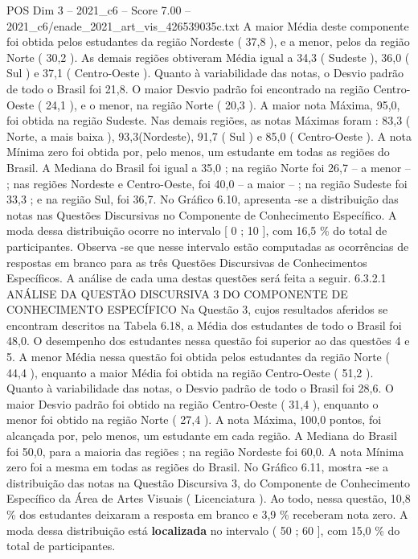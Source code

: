 \begin{textsample}{POS Dim 3 – 2021\_c6 – Score 7.00 – 2021\_c6/enade\_2021\_art\_vis\_426539035c.txt}
A maior Média deste componente foi obtida pelos estudantes da região Nordeste ( 37,8 ), e a menor, pelos da região Norte ( 30,2 ).
As demais regiões obtiveram Média igual a 34,3 ( Sudeste ), 36,0 ( Sul ) e 37,1 ( Centro-Oeste ).
Quanto à variabilidade das notas, o Desvio padrão de todo o Brasil foi 21,8.
O maior Desvio padrão foi encontrado na região Centro-Oeste ( 24,1 ), e o menor, na região Norte ( 20,3 ).
A maior nota Máxima, 95,0, foi obtida na região Sudeste.
Nas demais regiões, as notas Máximas foram : 83,3 ( Norte, a mais baixa ), 93,3(Nordeste), 91,7 ( Sul ) e 85,0 ( Centro-Oeste ).
A nota Mínima zero foi obtida por, pelo menos, um estudante em todas as regiões do Brasil.
A Mediana do Brasil foi igual a 35,0 ; na região Norte foi 26,7 – a menor – ; nas regiões Nordeste e Centro-Oeste, foi 40,0 – a maior – ; na região Sudeste foi 33,3 ; e na região Sul, foi 36,7.
No Gráfico 6.10, apresenta -se a distribuição das notas nas Questões Discursivas no Componente de Conhecimento Específico.
A moda dessa distribuição ocorre no intervalo [ 0 ; 10 ], com 16,5 \% do total de participantes.
Observa -se que nesse intervalo estão computadas as ocorrências de respostas em branco para as três Questões Discursivas de Conhecimentos Específicos.
A análise de cada uma destas questões será feita a seguir. 6.3.2.1 ANÁLISE DA QUESTÃO DISCURSIVA 3 DO COMPONENTE DE CONHECIMENTO ESPECÍFICO Na Questão 3, cujos resultados aferidos se encontram descritos na Tabela 6.18, a Média dos estudantes de todo o Brasil foi 48,0.
O desempenho dos estudantes nessa questão foi superior ao das questões 4 e 5.
A menor Média nessa questão foi obtida pelos estudantes da região Norte ( 44,4 ), enquanto a maior Média foi obtida na região Centro-Oeste ( 51,2 ).
Quanto à variabilidade das notas, o Desvio padrão de todo o Brasil foi 28,6.
O maior Desvio padrão foi obtido na região Centro-Oeste ( 31,4 ), enquanto o menor foi obtido na região Norte ( 27,4 ).
A nota Máxima, 100,0 pontos, foi alcançada por, pelo menos, um estudante em cada região.
A Mediana do Brasil foi 50,0, para a maioria das regiões ; na região Nordeste foi 60,0.
A nota Mínima zero foi a mesma em todas as regiões do Brasil.
No Gráfico 6.11, mostra -se a distribuição das notas na Questão Discursiva 3, do Componente de Conhecimento Específico da Área de Artes Visuais ( Licenciatura ).
Ao todo, nessa questão, 10,8 \% dos estudantes deixaram a resposta em branco e 3,9 \% receberam nota zero.
A moda dessa distribuição está \textbf{localizada} no intervalo ( 50 ; 60 ], com 15,0 \% do total de participantes.

\end{textsample}
